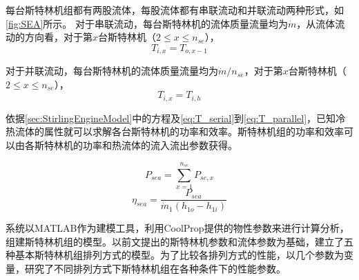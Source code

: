 每台斯特林机组都有两股流体，每股流体都有串联流动和并联流动两种形式，如\autoref{fig:SEA}所示。
对于串联流动，每台斯特林机的流体质量流量均为$\dot{m}$，从流体流动的方向看，对于第$x$台斯特林机（$2\leqslant{}x\leqslant{}n_{se}$），
\begin{equation}
	T_{i,x} = T_{o,x-1}
	\label{eq:T_serial}
\end{equation}

对于并联流动，每台斯特林机的流体质量流量均为$\dot{m}/n_{se}$，对于第$x$台斯特林机（$2\leqslant{}x\leqslant{}n_{se}$），
\begin{equation}
	T_{i,x} = T_{i,h}
	\label{eq:T_parallel}
\end{equation}

依据\autoref{sec:StirlingEngineModel}中的方程及\autoref{eq:T_serial}到\autoref{eq:T_parallel}，已知冷热流体的属性就可以求解各台斯特林机的功率和效率。斯特林机组的功率和效率可以由各斯特林机的功率和热流体的流入流出参数获得。

\begin{equation}
	P_{sea} = \sum_{x = 1}^{n_{se}}P_{se,x}
\end{equation}
\begin{equation}
	\eta_{sea} = \dfrac{P_{sea}}{\dot{m}_1(h_{1o} - h_{1i})}
\end{equation}

系统以MATLAB作为建模工具，利用CoolProp提供的物性参数来进行计算分析，组建斯特林机组的模型。以前文提出的斯特林机参数和流体参数为基础，建立了五种基本斯特林机组排列方式的模型。为了比较各排列方式的性能，以几个参数为变量，研究了不同排列方式下斯特林机组在各种条件下的性能参数。

